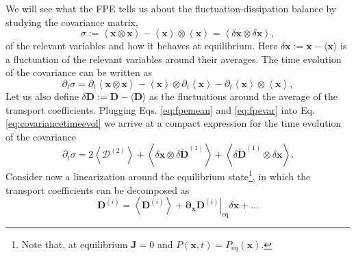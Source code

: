\documentclass[twoside,openright,titlepage,numbers=noenddot,%
headinclude,footinclude,cleardoublepage=empty,abstract=on,
BCOR=5mm,fontsize=11pt, dvipsnames, paper=b5
]{scrreprt}
\renewcommand{\vec}[1]{\bm{#1}}
\newcommand{\tens}[1]{\bm{\mathcal{#1}}}
\begin{document}
We will see what the \gls{FPE} tells us about the fluctuation-dissipation balance by studying the covariance matrix,
\begin{equation}
  \label{eq:covariance}
\tens{\sigma} := \left\langle\vec{x}\otimes\vec{x}\right\rangle-\left\langle\vec{x}\right\rangle\otimes\left\langle\vec{x}\right\rangle=\left\langle \delta\vec{x}\otimes\delta\vec{x}\right\rangle,
\end{equation}
of the relevant variables and how it behaves at equilibrium. Here $\delta\vec{x} := \vec{x} - \langle\vec{x}\rangle$ is a fluctuation of the relevant variables around their averages.
The time evolution of the covariance can be written as
\begin{equation}
  \label{eq:covariancetimeevol}
\partial_t\tens{\sigma} =\partial_t\left\langle\vec{x}\otimes\vec{x}\right\rangle-\left\langle\vec{x}\right\rangle\otimes\partial_t\left\langle\vec{x}\right\rangle -\partial_t\left\langle\vec{x}\right\rangle\otimes\left\langle\vec{x}\right\rangle,
\end{equation}
Let us also define $\delta\vec{D} := \vec{D} - \langle\vec{D}\rangle$ as the fluctuations around the average of the transport coefficients.
Plugging Eqs. \eqref{eq:fpemean} and \eqref{eq:fpevar} into Eq. \eqref{eq:covariancetimeevol} we arrive at a compact expression for the time evolution of the covariance
\begin{equation}
  \label{eq:fpefdsigma}
  \partial_t\tens{\sigma} = 2\left\langle\tens{D}^{(2)} \right\rangle + \left\langle \delta\vec{x}\otimes\delta\widetilde{\vec{D}}^{(1)} \right\rangle + \left\langle \delta\widetilde{\vec{D}}^{(1)}\otimes\delta\vec{x} \right\rangle.
\end{equation}
Consider now a linearization around the equilibrium state\footnote{Note that, at equilibrium $\vec{J}=0$ and $P(\vec{x},t) = P_{\text{eq}}(\vec{x})$.}, in which the transport coefficients can be decomposed as
\begin{equation}
  \label{eq:fpefdcoeff}
  \vec{D}^{(i)} = \left\langle\vec{D}^{(i)}\right\rangle + \left.\vec{\partial}_{\vec{x}}\vec{D}^{(i)}\right|_{\text{eq}}\delta\vec{x}+\dots
\end{equation}
\end{document}
